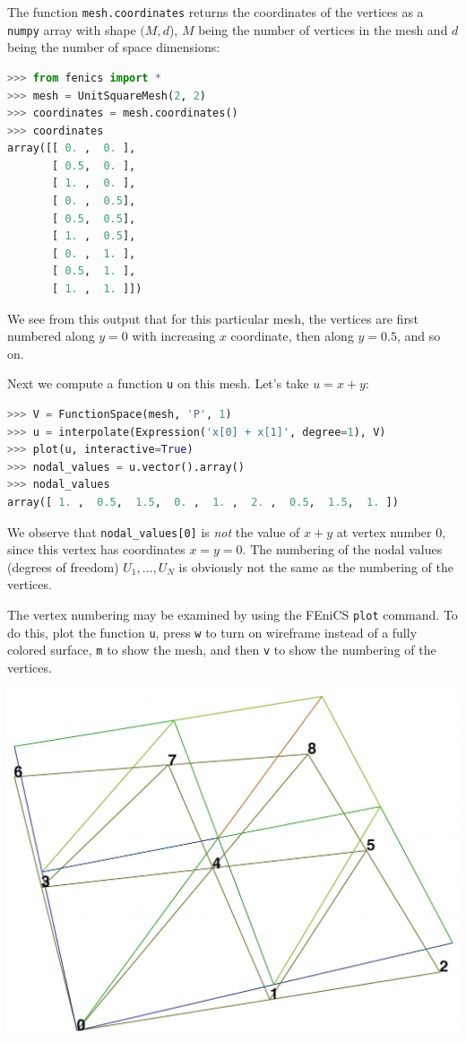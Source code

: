 \documentclass[graybox,envcountchap,sectrefs,final]{svmonodo}
\begin{document}
The function \texttt{mesh.coordinates} returns the coordinates of the
vertices as a \texttt{numpy} array with shape $(M,d$), $M$ being the number
of vertices in the mesh and $d$ being the number of space dimensions:

\begin{lstlisting}[language=Python,style=graycolor]
>>> from fenics import *
>>> mesh = UnitSquareMesh(2, 2)
>>> coordinates = mesh.coordinates()
>>> coordinates
array([[ 0. ,  0. ],
       [ 0.5,  0. ],
       [ 1. ,  0. ],
       [ 0. ,  0.5],
       [ 0.5,  0.5],
       [ 1. ,  0.5],
       [ 0. ,  1. ],
       [ 0.5,  1. ],
       [ 1. ,  1. ]])
\end{lstlisting}
We see from this output that for this particular mesh, the vertices
are first numbered along $y=0$
with increasing $x$ coordinate, then along $y=0.5$, and so on.

Next we compute a function \texttt{u} on this mesh. Let's take $u=x+y$:

\begin{lstlisting}[language=Python,style=graycolor]
>>> V = FunctionSpace(mesh, 'P', 1)
>>> u = interpolate(Expression('x[0] + x[1]', degree=1), V)
>>> plot(u, interactive=True)
>>> nodal_values = u.vector().array()
>>> nodal_values
array([ 1. ,  0.5,  1.5,  0. ,  1. ,  2. ,  0.5,  1.5,  1. ])
\end{lstlisting}
We observe that \Verb!nodal_values[0]! is \emph{not} the value of $x+y$ at
vertex number 0, since this vertex has coordinates $x=y=0$. The
numbering of the nodal values (degrees of freedom) $U_1,\ldots,U_{N}$
is obviously not the same as the numbering of the vertices.

The vertex numbering may be examined by using the FEniCS \texttt{plot}
command. To do this, plot the function \texttt{u}, press \texttt{w} to turn on
wireframe instead of a fully colored surface, \texttt{m} to show the mesh,
and then \texttt{v} to show the numbering of the vertices.



\vspace{6mm}

\centerline{\includegraphics[width=0.75\linewidth]{fig/vertex_numbering.png}}
\end{document}
